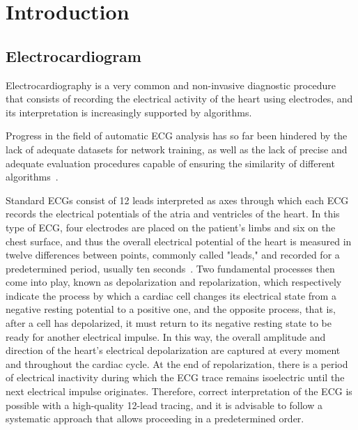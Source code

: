 \documentclass[12pt,italian]{report}
\newcommand\blankpage{
    \null
    \thispagestyle{empty}
    \addtocounter{page}{-1}
    \newpage}
\begin{document}
\afterpage{\blankpage}
\frontespizio
\beforepreface
\afterpreface
\afterpage{\blankpage}

\chapter{Introduction}
\label{chap:introduction}

\section{Electrocardiogram}
\label{sec:electrocardiogram}

Electrocardiography is a very common and non-invasive diagnostic procedure that consists of recording the electrical activity of the heart using electrodes, and its interpretation is increasingly supported by algorithms.

Progress in the field of automatic ECG analysis has so far been hindered by the lack of adequate datasets for network training, as well as the lack of precise and adequate evaluation procedures capable of ensuring the similarity of different algorithms~\cite{deeplearning}.

Standard ECGs consist of 12 leads interpreted as axes through which each ECG records the electrical potentials of the atria and ventricles of the heart. In this type of ECG, four electrodes are placed on the patient's limbs and six on the chest surface, and thus the overall electrical potential of the heart is measured in twelve differences between points, commonly called "leads," and recorded for a predetermined period, usually ten seconds~\cite{ecg}. Two fundamental processes then come into play, known as depolarization and repolarization, which respectively indicate the process by which a cardiac cell changes its electrical state from a negative resting potential to a positive one, and the opposite process, that is, after a cell has depolarized, it must return to its negative resting state to be ready for another electrical impulse. In this way, the overall amplitude and direction of the heart's electrical depolarization are captured at every moment and throughout the cardiac cycle. At the end of repolarization, there is a period of electrical inactivity during which the ECG trace remains isoelectric until the next electrical impulse originates. Therefore, correct interpretation of the ECG is possible with a high-quality 12-lead tracing, and it is advisable to follow a systematic approach that allows proceeding in a predetermined order.
\end{document}
